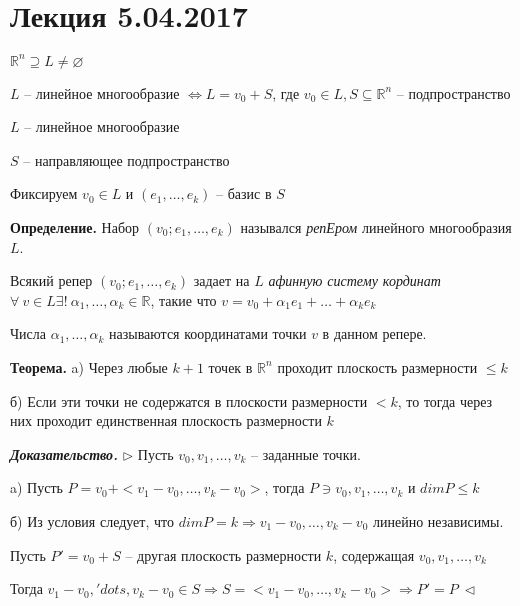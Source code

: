 \section{Лекция 5.04.2017}

$\mathbb{R}^n \supseteq L \neq \varnothing$

$L$ -- линейное многообразие $\Leftrightarrow L = v_0 + S$, где $v_0 \in L, S \subseteq \mathbb{R}^n$ -- подпространство

\vspace{\baselineskip}
$L$ -- линейное многообразие

$S$ -- направляющее подпространство

Фиксируем $v_0 \in L$ и $(e_1, \dots, e_k)$ -- базис в $S$

\vspace{\baselineskip}
\textbf{Определение.} Набор $(v_0; e_1, \dots, e_k)$ назывался \textit{репЕром} линейного многообразия $L$.

\vspace{\baselineskip}
Всякий репер $(v_0; e_1, \dots, e_k)$ задает на $L$ \textit{афинную систему кординат} $\forall \ v \in L \exists! \ \alpha_1, \dots, \alpha_k \in \mathbb{R}$, такие что $v = v_0 + \alpha_1 e_1 + \dots + \alpha_k e_k$

\vspace{\baselineskip}
Числа $\alpha_1, \dots, \alpha_k$ называются координатами точки $v$ в данном репере.

\vspace{\baselineskip}
\textbf{Теорема.} a) Через любые $k+1$ точек в $\mathbb{R}^n$ проходит плоскость размерности $\leq k$

б) Если эти точки не содержатся в плоскости размерности $<k$, то тогда через них проходит единственная плоскость размерности $k$

\vspace{\baselineskip}
\textbf{\textit{Доказательство.}} $\rhd$ Пусть $v_0, v_1, \dots, v_k$ -- заданные точки. 

a) Пусть $P = v_0 + <v_1 - v_0, \dots, v_k - v_0>$, тогда $P \ni v_0, v_1, \dots, v_k$ и $dimP \leq k$

б) Из условия следует, что $dimP = k \Rightarrow v_1 - v_0, \dots, v_k - v_0$ линейно независимы.

Пусть $P' = v_0 + S$ -- другая плоскость размерности $k$, содержащая $v_0, v_1, \dots, v_k$

Тогда $v_1 - v_0, 'dots, v_k - v_0 \in S \Rightarrow S = <v_1 - v_0, \dots, v_k - v_0> \Rightarrow P' = P \ \lhd$

